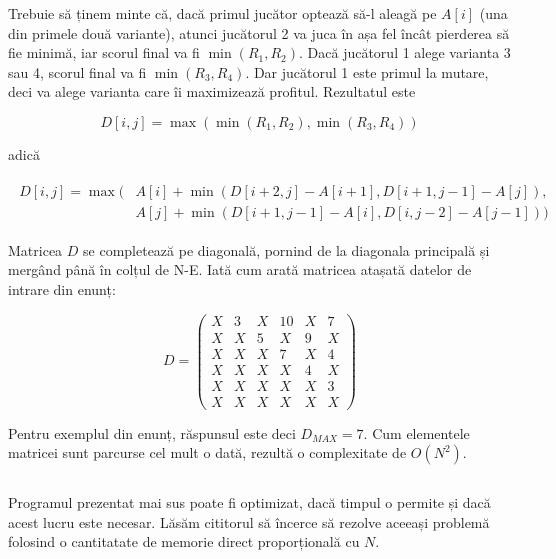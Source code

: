 Trebuie să ținem minte că, dacă primul jucător optează să-l aleagă pe $A[i]$
(una din primele două variante), atunci jucătorul 2 va juca în așa fel încât
pierderea să fie minimă, iar scorul final va fi $\min(R_1,R_2)$. Dacă
jucătorul 1 alege varianta 3 sau 4, scorul final va fi $\min(R_3,R_4)$. Dar
jucătorul 1 este primul la mutare, deci va alege varianta care îi maximizează
profitul. Rezultatul este

\begin{equation}
  D[i,j] = \max(\min(R_1, R_2), \min(R_3, R_4))
\end{equation}

adică

\begin{align}
  \begin{split}
    D[i,j] = \max( & A[i] + \min(D[i + 2, j] - A[i + 1], D[i + 1, j - 1] - A[j]), \\
    & A[j] + \min(D[i + 1, j - 1] - A[i], D[i, j - 2] - A[j - 1]))
  \end{split}
\end{align}

Matricea $D$ se completează pe diagonală, pornind de la diagonala principală
și mergând până în colțul de N-E. Iată cum arată matricea atașată datelor de
intrare din enunț:

\begin{equation}
  D =
  \begin{pmatrix}
    X & 3 & X & 10 & X & 7 \\
    X & X & 5 & X & 9 & X \\
    X & X & X & 7 & X & 4 \\
    X & X & X & X & 4 & X \\
    X & X & X & X & X & 3 \\
    X & X & X & X & X & X
  \end{pmatrix}
\end{equation}

Pentru exemplul din enunț, răspunsul este deci $D_{MAX}=7$. Cum elementele
matricei sunt parcurse cel mult o dată, rezultă o complexitate de $O(N^2)$.

\inputminted{c}{src/problem4-2.c}

Programul prezentat mai sus poate fi optimizat, dacă timpul o permite și dacă
acest lucru este necesar. Lăsăm cititorul să încerce să rezolve aceeași
problemă folosind o cantitatate de memorie direct proporțională cu $N$.
